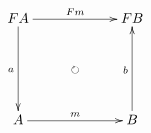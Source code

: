 \documentclass[12pt]{article}
\begin{document}
\pagestyle{empty}

\begin{align*}
  \vcenter{
    \xymatrix@=60pt{
      F A
      \ar@{->}[r]^{F m}
      \ar@{->}[d]_{a}
      \ar@{{}{ }{}}[rd]|{\circlearrowright}
      &
      F B
      \\
      A
      \ar@{->}[r]^{m}
      &
      B
      \ar@{->}[u]^{b}
    }
  }
\end{align*}
\end{document}
